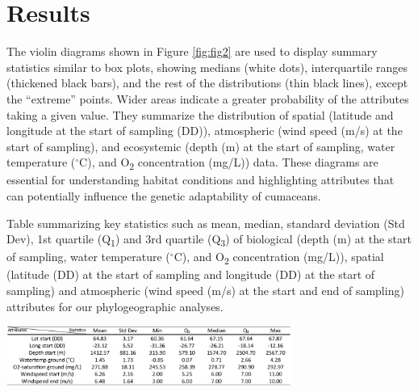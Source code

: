 \section{Results}\label{results}
The violin diagrams shown in Figure \ref{fig:fig2} are used to display summary statistics similar to box plots, showing medians (white dots), interquartile ranges (thickened black bars), and the rest of the distributions (thin black lines), except the ``extreme'' points. Wider areas indicate a greater probability of the attributes taking a given value. They summarize the distribution of spatial (latitude and longitude at the start of sampling (DD)), atmospheric (wind speed (m/s) at the start of sampling), and ecosystemic (depth (m) at the start of sampling, water temperature ($^\circ$C), and O\textsubscript{2} concentration (mg/L)) data. These diagrams are essential for understanding habitat conditions and highlighting attributes that can potentially influence the genetic adaptability of cumaceans. 

\begin{table}[H]
    \centering
    \caption{Table summarizing key statistics such as mean, median, standard deviation (Std Dev), 1st quartile (Q\textsubscript{1}) and 3rd quartile (Q\textsubscript{3}) of biological (depth (m) at the start of sampling, water temperature ($^\circ$C), and O\textsubscript{2} concentration (mg/L)), spatial (latitude (DD) at the start of sampling and longitude (DD) at the start of sampling) and atmospheric (wind speed (m/s) at the start and end of sampling) attributes for our phylogeographic analyses. \label{fig:tab1}}
    \includegraphics[width=0.7\textwidth]{Table_Attributes_Data.png}
\end{table}

